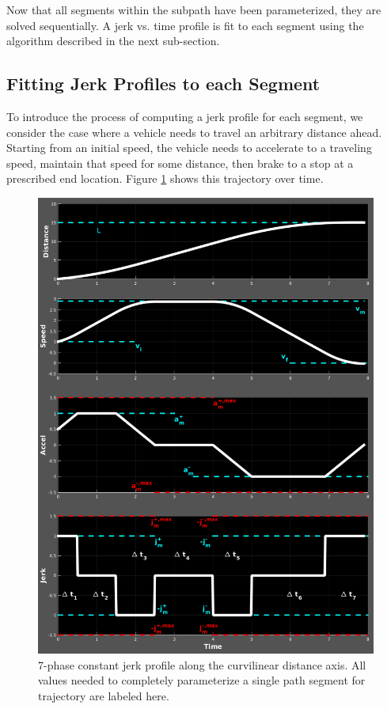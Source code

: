 \documentclass[letterpaper, 10 pt, conference]{ieeeconf}  %
\begin{document}
Now that all segments within the subpath have been parameterized, they are solved sequentially.
A jerk vs. time profile is fit to each segment using the algorithm described in the next sub-section.


\subsection{Fitting Jerk Profiles to each Segment} \label{sec:jerkprofiles}

To introduce the process of computing a jerk profile for each segment, we consider the case where a vehicle needs to travel an arbitrary distance ahead.
Starting from an initial speed, the vehicle needs to accelerate to a traveling speed, maintain that speed for some distance, then brake to a stop at a prescribed end location.
Figure \ref{fig:full7phasespec} shows this trajectory over time.

\begin{figure}[tb]
  \centering
  \includegraphics[width=0.7\columnwidth]{graphics/Full7PhaseSpecVertical.png}
  \caption{
    7-phase constant jerk profile along the curvilinear distance axis.
    All values needed to completely parameterize a single path segment for trajectory are labeled here.}
  \label{fig:full7phasespec}
\end{figure}
\end{document}
